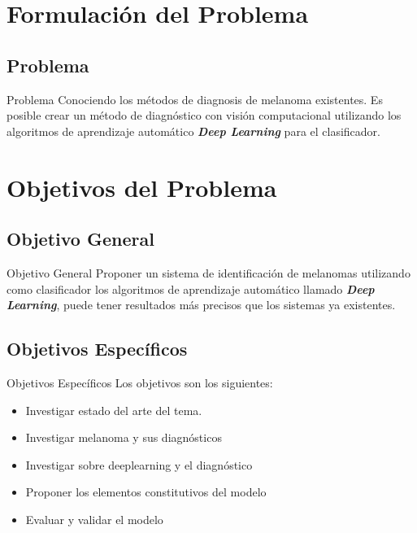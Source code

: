 \documentclass{beamer}
\begin{document}
%
\section{Formulación del Problema}
\subsection{Problema}
\begin{frame}{Problema}
Conociendo los métodos de diagnosis de melanoma existentes. Es posible crear un método de diagnóstico con visión computacional utilizando los algoritmos de aprendizaje automático \textbf{\textit{Deep Learning}} para el clasificador.
\end{frame}

\section{Objetivos del Problema}

\subsection{Objetivo General}

\begin{frame}{Objetivo General}
Proponer un sistema de identificación de melanomas utilizando como clasificador los algoritmos de aprendizaje automático llamado \textbf{\textit{Deep Learning}}, puede tener resultados más precisos que los sistemas ya existentes.
\end{frame}

\subsection{Objetivos Específicos}

\begin{frame}{Objetivos Específicos}
Los objetivos son los siguientes:
\begin{itemize}
	\item Investigar estado del arte del tema.
	\item Investigar melanoma y sus diagnósticos
	\item Investigar sobre deeplearning y el diagnóstico
	\item Proponer los elementos constitutivos del modelo
	\item Evaluar y validar el modelo
	
\end{itemize}
\end{frame}
\end{document}
